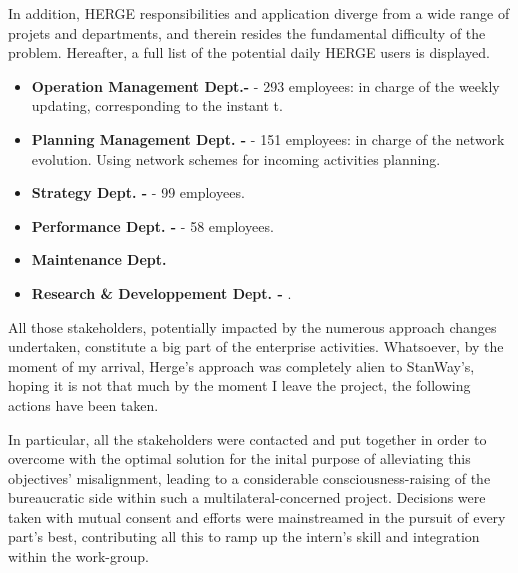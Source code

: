 In addition, HERGE responsibilities and application diverge from a wide range of projets and departments, and therein resides the fundamental difficulty of the problem. Hereafter, a full list of the potential daily HERGE users is displayed. 

\begin{itemize}
    \item\textbf{Operation Management Dept.-}  - 293 employees: in charge of the weekly updating, corresponding to the instant t.
    
    \item\textbf{Planning Management Dept. -}  - 151 employees: in charge of the network evolution. Using network schemes for incoming activities planning.
    
    \item\textbf{Strategy Dept. -}  - 99 employees.
    
    \item\textbf{Performance Dept. -}  - 58 employees.
    
    \item\textbf{Maintenance Dept.}
    
    \item\textbf{Research \& Developpement Dept. -} .
    
    
\end{itemize}


All those stakeholders, potentially impacted by the numerous approach changes undertaken, constitute a big part of the enterprise activities. Whatsoever, by the moment of my arrival, Herge's approach was completely alien to StanWay's, hoping it is not that much by the moment I leave the project, the following actions have been taken. 

In particular, all the stakeholders were contacted and put together in order to overcome with the optimal solution for the inital purpose of alleviating this objectives' misalignment, leading to a considerable consciousness-raising of the bureaucratic side within such a multilateral-concerned project. Decisions were taken with mutual consent and efforts were mainstreamed in the pursuit of every part's best, contributing all this to ramp up the intern's skill and integration within the work-group.

